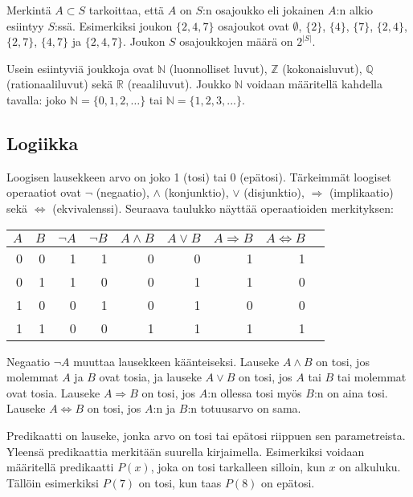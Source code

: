 Merkintä $A \subset S$ tarkoittaa,
että $A$ on $S$:n osajoukko
eli jokainen $A$:n alkio esiintyy $S$:ssä.
Esimerkiksi joukon $\{2,4,7\}$
osajoukot ovat $\emptyset$,
$\{2\}$, $\{4\}$, $\{7\}$, $\{2,4\}$, $\{2,7\}$, $\{4,7\}$ ja $\{2,4,7\}$.
Joukon $S$ osajoukkojen määrä on $2^{|S|}$.

Usein esiintyviä joukkoja ovat
$\mathbb{N}$ (luonnolliset luvut),
$\mathbb{Z}$ (kokonaisluvut),
$\mathbb{Q}$ (rationaaliluvut) sekä
$\mathbb{R}$ (reaaliluvut).
Joukko $\mathbb{N}$ voidaan määritellä
kahdella tavalla: joko $\mathbb{N}=\{0,1,2,\ldots\}$
tai $\mathbb{N}=\{1,2,3,...\}$.

\subsection{Logiikka}


Loogisen lausekkeen arvo on joko 1 (tosi) tai 0 (epätosi).
Tärkeimmät loogiset operaatiot ovat
$\lnot$ (negaatio),
$\land$ (konjunktio),
$\lor$ (disjunktio),
$\Rightarrow$ (implikaatio) sekä
$\Leftrightarrow$ (ekvivalenssi).
Seuraava taulukko näyttää operaatioiden merkityksen:

\begin{center}
\begin{tabular}{rr|rrrrrrr}
$A$ & $B$ & $\lnot A$ & $\lnot B$ & $A \land B$ & $A \lor B$ & $A \Rightarrow B$ & $A \Leftrightarrow B$ \\
\hline
0 & 0 & 1 & 1 & 0 & 0 & 1 & 1 \\
0 & 1 & 1 & 0 & 0 & 1 & 1 & 0 \\
1 & 0 & 0 & 1 & 0 & 1 & 0 & 0 \\
1 & 1 & 0 & 0 & 1 & 1 & 1 & 1 \\
\end{tabular}
\end{center}

Negaatio $\lnot A$ muuttaa lausekkeen käänteiseksi.
Lauseke $A \land B$ on tosi, jos molemmat $A$ ja $B$ ovat tosia,
ja lauseke $A \lor B$ on tosi, jos $A$ tai $B$ tai molemmat
ovat tosia.
Lauseke $A \Rightarrow B$ on tosi,
jos $A$:n ollessa tosi myös $B$:n on aina tosi.
Lauseke $A \Leftrightarrow B$ on tosi,
jos $A$:n ja $B$:n totuusarvo on sama.

Predikaatti on lauseke, jonka arvo on tosi tai epätosi
riippuen sen parametreista.
Yleensä predikaattia merkitään suurella kirjaimella.
Esimerkiksi voidaan määritellä predikaatti $P(x)$,
joka on tosi tarkalleen silloin, kun $x$ on alkuluku.
Tällöin esimerkiksi $P(7)$ on tosi, kun taas $P(8)$ on epätosi.

